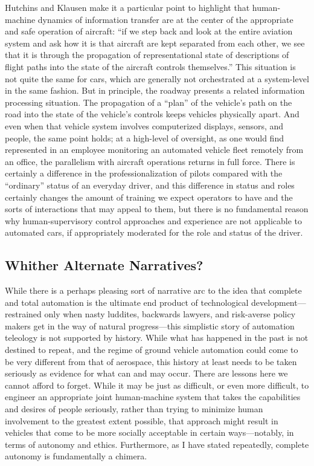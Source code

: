 Hutchins and Klausen make it a particular point to highlight that
human-machine dynamics of information transfer are at the center of
the appropriate and safe operation of aircraft: ``if we step back and
look at the entire aviation system and ask how
it is that aircraft are kept separated from each other, we see that it
is through the propagation of representational state of descriptions
of flight paths into the state of the aircraft controls
themselves.''\cite[p. 14]{hutchinsKlausen} This situation is not quite
the same for cars, which are generally not orchestrated at a
system-level in the same fashion. But in principle, the roadway presents a related
information processing situation. The propagation of a ``plan'' of the
vehicle's path on the 
road into the state of the vehicle's controls keeps vehicles
physically apart.
And even when that vehicle system involves computerized
displays, sensors, and people, the same point holds;  at a high-level of oversight, as
one would find represented in an employee monitoring an automated
vehicle fleet remotely 
from an office, the parallelism with aircraft operations returns in
full force. There is certainly a difference in the
professionalization of pilots compared with the ``ordinary'' status of an
everyday driver, and this difference in status and roles certainly
changes the amount of training we expect operators to have and the
sorts of interactions that may appeal to them, but there is no
fundamental reason why human-supervisory control approaches and
experience are not applicable to automated cars, if appropriately
moderated for the role and status of the driver. 

\subsection{Whither Alternate Narratives?}

While there is a perhaps pleasing sort of narrative arc to the idea
that complete and total automation is the ultimate end product of
technological development---restrained only when nasty luddites, backwards lawyers, and
risk-averse policy makers get in the way of natural progress---this
simplistic story of automation
teleology is not supported by history. While what has happened in the
past is not destined to repeat, and the regime of ground vehicle
automation could come to be very different from that of aerospace,
this history at least needs to be taken seriously as evidence for what
can and may occur. There are lessons here we cannot afford to forget.
While it may be just as difficult, or even more difficult, to engineer
an appropriate joint human-machine system that takes the capabilities
and desires of people seriously, rather than trying to minimize human
involvement to the greatest extent possible, that approach might
result in vehicles that 
come to be more socially acceptable in certain ways---notably, in
terms of autonomy and ethics. Furthermore, as I have stated
repeatedly, complete autonomy is fundamentally a chimera.

